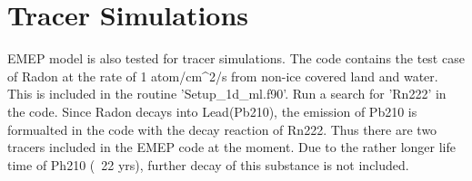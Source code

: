 \section{Tracer Simulations}

EMEP model is also tested for tracer simulations.  The code contains
the test case of Radon at the rate of 1 atom/cm^{2}/s from non-ice
covered land and water.  This is included in the routine
'Setup_1d_ml.f90'.  Run a search for 'Rn222' in the code.  Since Radon
decays into Lead(Pb210), the emission of Pb210 is formualted in the
code with the decay reaction of Rn222.  Thus there are two tracers
included in the EMEP code at the moment.  Due to the rather longer
life time of Ph210 (~22 yrs), further decay of this substance is not
included.   
